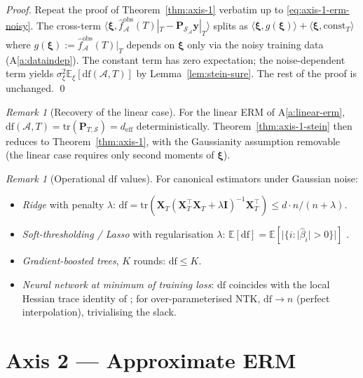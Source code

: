\documentclass[11pt,a4paper]{article}
\theoremstyle{plain}
\theoremstyle{definition}
\theoremstyle{remark}
\newtheorem{remark}[theorem]{Remark}
\newcommand{\by}{\mathbf{y}}
\newcommand{\bxi}{\boldsymbol{\xi}}
\newcommand{\bP}{\mathbf{P}}
\newcommand{\bI}{\mathbf{I}}
\newcommand{\bX}{\mathbf{X}}
\newcommand{\E}{\mathbb{E}}
\newcommand{\Scal}{\mathcal{S}}
\newcommand{\Acal}{\mathcal{A}}
\newcommand{\tr}{\mathrm{tr}}
\newcommand{\df}{\mathrm{df}}
\begin{document}
\begin{proof}
Repeat the proof of Theorem~\ref{thm:axis-1} verbatim up to
\eqref{eq:axis-1-erm-noisy}. The cross-term
$\langle \bxi, \hat f^{\mathrm{obs}}_\Acal(T)|_T - \bP_{\Scal_\Acal}\by|_T\rangle$
splits as $\langle \bxi, g(\bxi)\rangle + \langle \bxi, \mathrm{const}_T\rangle$
where $g(\bxi) := \hat f^{\mathrm{obs}}_\Acal(T)|_T$ depends on $\bxi$
only via the noisy training data (A\ref{a:dataindep}). The constant
term has zero expectation; the noise-dependent term yields
$\sigma_\xi^2 \E_\xi[\df(\Acal, T)]$ by Lemma~\ref{lem:stein-sure}.
The rest of the proof is unchanged. \qed
\end{proof}

\begin{remark}[Recovery of the linear case]
\label{rem:stein-linear}
For the linear ERM of A\ref{a:linear-erm},
$\df(\Acal, T) = \tr(\bP_{T,\Scal}) = d_{\mathrm{eff}}$ deterministically.
Theorem~\ref{thm:axis-1-stein} then reduces to
Theorem~\ref{thm:axis-1}, with the Gaussianity assumption
removable (the linear case requires only second moments of $\bxi$).
\end{remark}

\begin{remark}[Operational $\df$ values]
\label{rem:df-values}
For canonical estimators under Gaussian noise:
\begin{itemize}[label=$\bullet$,leftmargin=*]
\item \emph{Ridge} with penalty $\lambda$:
    $\df = \tr(\bX_T(\bX_T^\top \bX_T + \lambda\bI)^{-1}\bX_T^\top)
    \le d \cdot n/(n + \lambda)$.
\item \emph{Soft-thresholding / Lasso} with regularisation $\lambda$:
    $\E[\df] = \E[|\{i : |\hat\beta_i| > 0\}|]$
    \citep[Zou--Hastie--Tibshirani 2007, Thm.~1]{ZouHastieTibshirani2007}.
\item \emph{Gradient-boosted trees}, $K$ rounds: $\df \le K$.
\item \emph{Neural network at minimum of training loss}: $\df$
    coincides with the local Hessian trace identity of
    \citet{Gao2022efronnn}; for over-parameterised NTK, $\df \to n$
    (perfect interpolation), trivialising the slack.
\end{itemize}
\end{remark}

\section{Axis 2 --- Approximate ERM}
\label{sec:axis-2}
\end{document}
